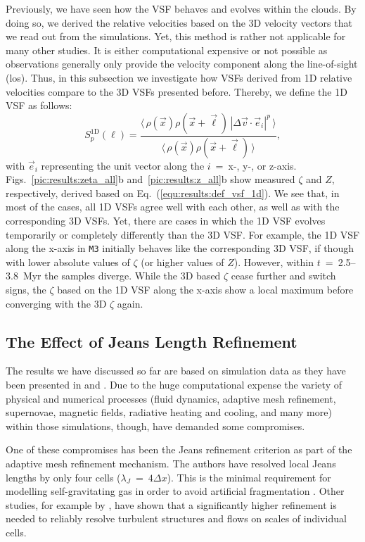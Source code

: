 Previously, we have seen how the VSF behaves and evolves within the clouds.
By doing so, we derived the relative velocities based on the 3D velocity vectors that we read out from the simulations.
Yet, this method is rather not applicable for many other studies. 
It is either computational expensive or not possible as observations generally only provide the velocity component along the line-of-sight (los).
Thus, in this subsection we investigate how VSFs derived from 1D relative velocities compare to the 3D VSFs presented before.
Thereby, we define the 1D VSF as follows:
\begin{equation}
	\mathit{S}_p^\mathrm{1D} (\ell) = \frac{\langle \, \rho(\vec{x}) \rho(\vec{x}+\vec{\ell}) \, |\Delta \vec{v} \cdot \vec{e}_i|^p  \, \rangle}{\langle  \, \rho(\vec{x}) \rho(\vec{x}+\vec{\ell}) \, \rangle} ,
    \label{equ:results:def_vsf_1d}
\end{equation}
with $\vec{e}_i$ representing the unit vector along the $i$~=~x-, y-, or z-axis.
Figs.~\ref{pic:results:zeta_all}b and~\ref{pic:results:z_all}b show measured $\zeta$ and $Z$, respectively, derived based on Eq.~(\ref{equ:results:def_vsf_1d}). 
We see that, in most of the cases, all 1D VSFs agree well with each other, as well as with the corresponding 3D VSFs.
Yet, there are cases in which the 1D VSF evolves temporarily or completely differently than the 3D VSF.
For example, the 1D VSF along the x-axis in \texttt{M3} initially behaves like the corresponding 3D VSF, if though with lower absolute values of $\zeta$ (or higher values of $Z$).
However, within $t$~=~2.5--3.8~Myr the samples diverge. 
While the 3D based $\zeta$ cease further and switch signs, the $\zeta$ based on the 1D VSF along the x-axis show a local maximum before converging with the 3D $\zeta$ again. 


\subsection{The Effect of Jeans Length Refinement}\label{results:refinement}

The results we have discussed so far are based on simulation data as they have been presented in  and .
Due to the huge computational expense the variety of physical and numerical processes (fluid dynamics, adaptive mesh refinement, supernovae, magnetic fields, radiative heating and cooling, and many more) within those simulations, though, have demanded some compromises.

One of these compromises has been the Jeans refinement criterion as part of the adaptive mesh refinement mechanism.
The authors have resolved local Jeans lengths by only four cells ($\lambda_J$~=~$4\Delta{}x$).
This is the minimal requirement for modelling self-gravitating gas in order to avoid artificial fragmentation \citep{Truelove1998}. 
Other studies, for example by \citet{Turk2012}, have shown that a significantly higher refinement is needed to reliably resolve turbulent structures and flows on scales of individual cells.

